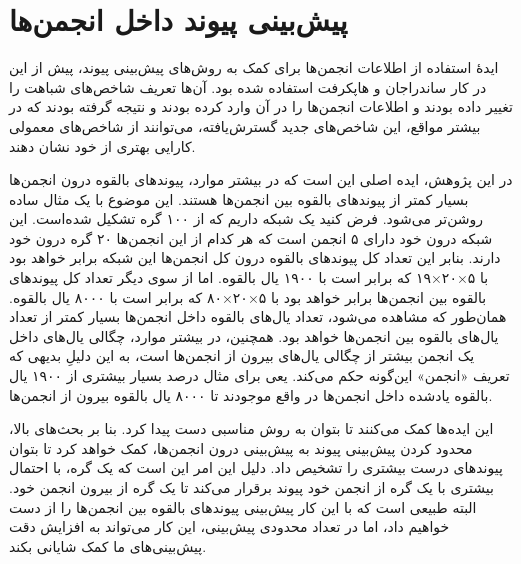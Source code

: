 \section{پیش‌بینی پیوند داخل انجمن‌ها}

ایدهٔ استفاده از اطلاعات انجمن‌ها برای کمک به روش‌های پیش‌بینی پیوند، پیش از این در کار ساندراجان و هاپکرفت \cite{soundarajan2012using} استفاده شده بود. آن‌ها تعریف شاخص‌های شباهت را تغییر داده بودند و اطلاعات انجمن‌ها را در آن وارد کرده بودند و نتیجه گرفته بودند که در بیشتر مواقع، این شاخص‌های جدید گسترش‌یافته، می‌توانند از شاخص‌های معمولی کارایی بهتری از خود نشان دهند.

در این پژوهش، ایده اصلی این است که در بیشتر موارد، پیوندهای بالقوه درون انجمن‌ها بسیار کمتر از پیوندهای بالقوه بین انجمن‌ها هستند. این موضوع با یک مثال ساده روشن‌تر می‌شود. فرض کنید یک شبکه داریم که از ۱۰۰ گره تشکیل شده‌است. این شبکه درون خود دارای ۵ انجمن است که هر کدام از این انجمن‌ها ۲۰ گره درون خود دارند. بنابر این تعداد کل پیوندهای بالقوه درون کل انجمن‌ها این شبکه برابر خواهد بود با ۵‫×‬۲۰‫×‬۱۹ که برابر است با ۱۹۰۰ یال بالقوه. اما از سوی دیگر تعداد کل پیوندهای بالقوه بین انجمن‌ها برابر خواهد بود با ۵‫×‬۲۰‫×‬۸۰ که برابر است با ۸۰۰۰ یال بالقوه. همان‌طور که مشاهده می‌شود، تعداد یال‌های بالقوه داخل انجمن‌ها بسیار کمتر از تعداد یال‌های بالقوه بین انجمن‌ها خواهد بود. همچنین، در بیشتر موارد، چگالی یال‌های داخل یک انجمن بیشتر از چگالی یال‌های بیرون از انجمن‌ها است، به این دلیلِ بدیهی که تعریف «انجمن» این‌گونه حکم می‌کند. یعی برای مثال درصد بسیار بیشتری از ۱۹۰۰ یال بالقوه یادشده داخل انجمن‌ها در واقع موجودند تا ۸۰۰۰ یال بالقوه بیرون از انجمن‌ها.

این ایده‌ها کمک می‌کنند تا بتوان به روش مناسبی دست پیدا کرد. بنا بر بحث‌های بالا، محدود کردن پیش‌بینی پیوند به پیش‌بینی درون انجمن‌ها، کمک خواهد کرد تا بتوان پیوندهای درست بیشتری را تشخیص داد. دلیل این امر این است که یک گره، با احتمال بیشتری با یک گره از انجمن خود پیوند برقرار می‌کند تا یک گره از بیرون انجمن‌ خود. البته طبیعی است که با این کار پیش‌بینی پیوندهای بالقوه بین انجمن‌ها را از دست خواهیم داد، اما در تعداد محدودی پیش‌بینی، این کار می‌تواند به افزایش دقت پیش‌بینی‌های ما کمک شایانی بکند.

